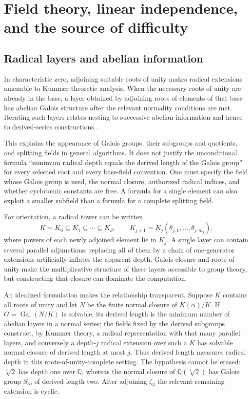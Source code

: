 \documentclass[11pt,oneside]{article}
\numberwithin{equation}{section}
\theoremstyle{definition}
\theoremstyle{remark}
\newcommand{\Q}{\mathbb{Q}}
\newcommand{\Gal}{\operatorname{Gal}}
\begin{document}
\section{Field theory, linear independence, and the source of difficulty}\label{sec:fields}

\subsection{Radical layers and abelian information}
In characteristic zero, adjoining suitable roots of unity makes radical extensions amenable to Kummer-theoretic analysis. When the necessary roots of unity are already in the base, a layer obtained by adjoining roots of elements of that base has abelian Galois structure after the relevant normality conditions are met. Iterating such layers relates nesting to successive abelian information and hence to derived-series constructions \cite{landau,hornghuang,honsbeek}.

This explains the appearance of Galois groups, their subgroups and quotients, and splitting fields in general algorithms. It does not justify the unconditional formula ``minimum radical depth equals the derived length of the Galois group'' for every selected root and every base-field convention. One must specify the field whose Galois group is used, the normal closure, authorized radical indices, and whether cyclotomic constants are free. A formula for a single element can also exploit a smaller subfield than a formula for a complete splitting field.

For orientation, a radical tower can be written
\[
K=K_0\subseteq K_1\subseteq\cdots\subseteq K_d,
\qquad K_{j+1}=K_j(\theta_{j,1},\ldots,\theta_{j,m_j}),
\]
where powers of each newly adjoined element lie in $K_j$. A single layer can contain several parallel adjunctions; replacing all of them by a chain of one-generator extensions artificially inflates the apparent depth. Galois closure and roots of unity make the multiplicative structure of these layers accessible to group theory, but constructing that closure can dominate the computation.

An idealized formulation makes the relationship transparent. Suppose $K$ contains all roots of unity and let $N$ be the finite normal closure of $K(\alpha)/K$. If $G=\Gal(N/K)$ is solvable, its derived length is the minimum number of abelian layers in a normal series; the fields fixed by the derived subgroups construct, by Kummer theory, a radical representation with that many parallel layers, and conversely a depth-$j$ radical extension over such a $K$ has solvable normal closure of derived length at most $j$. Thus derived length measures radical depth in this roots-of-unity-complete setting. The hypothesis cannot be erased: $\sqrt[3]2$ has depth one over $\Q$, whereas the normal closure of $\Q(\sqrt[3]2)$ has Galois group $S_3$, of derived length two. After adjoining $\zeta_3$ the relevant remaining extension is cyclic.
\end{document}
